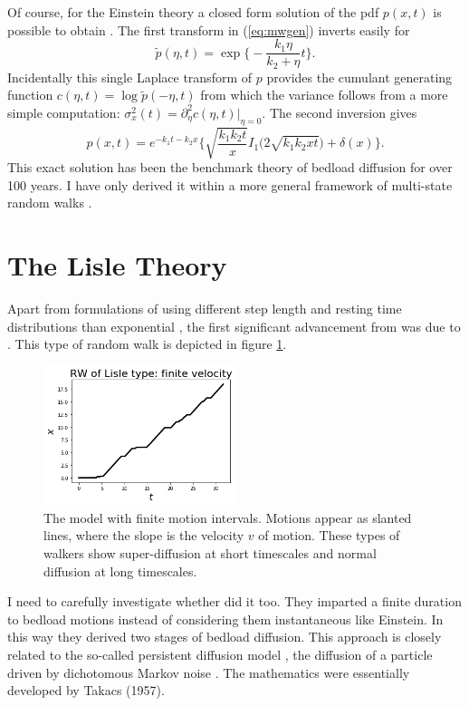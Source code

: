 \documentclass[11pt]{article}
\newcommand\be{\begin{equation}} %
\newcommand\ee{\end{equation}}   %
\begin{document}
Of course, for the Einstein theory a closed form solution of the pdf $p(x,t)$ is possible to obtain \citep[e.g.][]{Einstein1937, Hubbell1964, Daly2006,Daly2019}.
The first transform in (\ref{eq:mwgen}) inverts easily for 
\be \tilde{p}(\eta,t) = \exp\Big\{-\frac{k_1\eta }{k_2 + \eta} t\Big\}.\ee
Incidentally this single Laplace transform of $p$ provides the cumulant generating function $c(\eta,t) = \log \tilde{p}(-\eta,t)$ from which the variance follows from a more simple computation: $\sigma_x^2(t) = \partial_\eta^2 c(\eta,t)\big|_{\eta=0}.$
The second inversion gives \citep[e.g.][]{Daly2019}
\be p(x,t) = e^{-k_1 t -k_2 x}\Big\{ \sqrt{\frac{k_1 k_2 t}{ x}} I_1\Big( 2\sqrt{k_1k_2 x t}\Big) + \delta(x) \Big\} .\ee
This exact solution has been the benchmark theory of bedload diffusion for over 100 years. I have only derived it within a more general framework of multi-state random walks \citep[e.g.][]{Weiss1994}.

\section{The Lisle Theory}
Apart from formulations of \citet{Einstein1937} using different step length and resting time distributions than exponential \citep[e.g.][]{Sayre1965}, the first significant advancement from \citet{Einstein1937} was due to \citet{Lisle1998}.
This type of random walk is depicted in figure \ref{fig:lislewalk}.
\begin{figure}
	\centering
	\includegraphics[width=0.5\textwidth,keepaspectratio]{lisle_rw.png}
	\caption{The \citet{Lisle1998} model with finite motion intervals. Motions appear as slanted lines, where the slope is the velocity $v$ of motion. These types of walkers show super-diffusion at short timescales and normal diffusion at long timescales.}
	\label{fig:lislewalk}
\end{figure}
I need to carefully investigate whether \citet{Gordon1972} did it too.
They imparted a finite duration to bedload motions instead of considering them instantaneous like Einstein. In this way they derived two stages of bedload diffusion.
This approach is closely related to the so-called persistent diffusion model \citep{Balakrishnan1988,VanDenBroeck1990}, the diffusion of a particle driven by dichotomous Markov noise \citep[e.g.][]{Horsthemke1984,Risken1989,Bena2006}. 
The mathematics were essentially developed by Takacs (1957).
\end{document}

